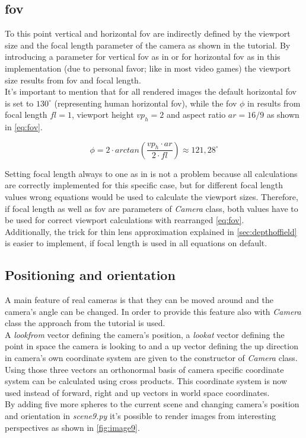 \documentclass[]{article}
\begin{document}
		\subsection{\ac{fov}}
		\label{sec:fov}
			To this point vertical and horizontal \ac{fov} are indirectly defined by the viewport size and the focal length parameter of the camera as shown in the tutorial. By introducing a parameter for vertical \ac{fov} as in \cite{Shirley2020RTW1} or for horizontal \ac{fov} as in this implementation (due to personal favor; like in most video games) the viewport size results from \ac{fov} and focal length.
			\\
			It's important to mention that for all rendered images the default horizontal \ac{fov} is set to $130^{\circ}$ (representing human horizontal \ac{fov}), while the \ac{fov} $\phi$ in \cite{Shirley2020RTW1} results from focal length $fl=1$, viewport height $vp_h=2$ and aspect ratio $ar=\label{key}16/9$ as shown in \cref{eq:fov}.
			
			\begin{equation}
				\label{eq:fov}
				\phi = 2\cdot arctan\left(\frac{vp_h\cdot ar}{2\cdot fl}\right) \approx 121,28^{\circ}
			\end{equation}
		 
			 Setting focal length always to one as in \cite{Shirley2020RTW1} is not a problem because all calculations are correctly implemented for this specific case, but for different focal length values wrong equations would be used to calculate the viewport sizes. Therefore, if focal length as well as \ac{fov} are parameters of \emph{Camera} class, both values have to be used for correct viewport calculations with rearranged \cref{eq:fov}. 
			 \\
			 Additionally, the trick for thin lens approximation explained in \cref{sec:depthoffield} is easier to implement, if focal length is used in all equations on default.
			
		\subsection{Positioning and orientation}
			A main feature of real cameras is that they can be moved around and the camera's angle can be changed. In order to provide this feature also with \emph{Camera} class the approach from the tutorial is used.
			\\
			A \emph{lookfrom} vector defining the camera's position, a \emph{lookat} vector defining the point in space the camera is looking to and a up vector defining the up direction in camera's own coordinate system are given to the constructor of \emph{Camera} class. Using those three vectors an orthonormal basis of camera specific coordinate system can be calculated using cross products. This coordinate system is now used instead of forward, right and up vectors in world space coordinates.
			\\
			By adding five more spheres to the current scene and changing camera's position and orientation in \emph{scene9.py} it's possible to render images from interesting perspectives as shown in \cref{fig:image9}.
			
\end{document}
